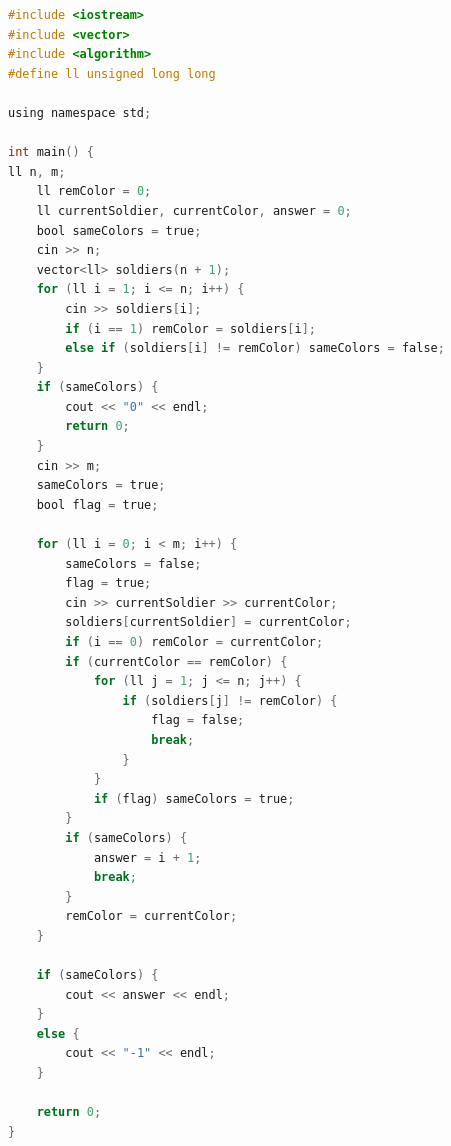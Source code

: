\documentclass[a4paper,12pt]{article}
\begin{document}
\begin{lstlisting}[language=C]
#include <iostream>
#include <vector>
#include <algorithm>
#define ll unsigned long long

using namespace std;

int main() {
ll n, m;
    ll remColor = 0;
    ll currentSoldier, currentColor, answer = 0;
    bool sameColors = true;
    cin >> n;
    vector<ll> soldiers(n + 1);
    for (ll i = 1; i <= n; i++) {
        cin >> soldiers[i];
        if (i == 1) remColor = soldiers[i];
        else if (soldiers[i] != remColor) sameColors = false;
    }
    if (sameColors) {
        cout << "0" << endl;
        return 0;
    }
    cin >> m;
    sameColors = true;
    bool flag = true;
    
    for (ll i = 0; i < m; i++) {
        sameColors = false;
        flag = true;
        cin >> currentSoldier >> currentColor;
        soldiers[currentSoldier] = currentColor;
        if (i == 0) remColor = currentColor;
        if (currentColor == remColor) {
            for (ll j = 1; j <= n; j++) {
                if (soldiers[j] != remColor) {
                    flag = false;
                    break;
                }
            }
            if (flag) sameColors = true;
        }
        if (sameColors) {
            answer = i + 1;
            break;
        }
        remColor = currentColor;
    }
    
    if (sameColors) {
        cout << answer << endl;
    }
    else {
        cout << "-1" << endl;
    }
    
	return 0;
}
\end{lstlisting}
\end{document}
